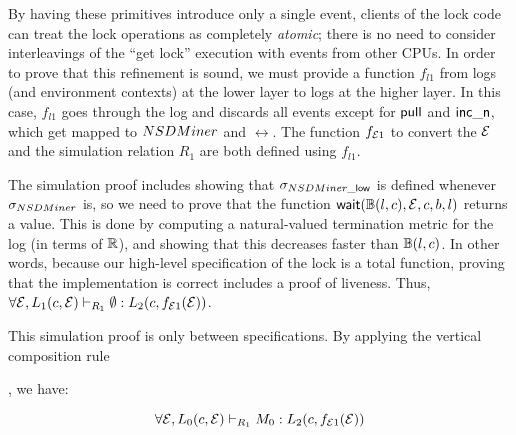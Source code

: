 By having these primitives introduce only a single event, clients of the
lock code can treat the lock operations as completely \emph{atomic}; there is
no need to consider interleavings of the ``get lock'' execution
with events from other CPUs. In order to prove that this refinement
is sound, we must provide a function $f_{l1}$ from logs (and environment
contexts) at the lower layer to logs at the higher layer.  In this
case, $f_{l1}$ goes through the log and discards all events except for
$\mathsf{pull}$ and $\mathsf{inc\_n}$, which get mapped to $NSDMiner$ and
$\rel$.
The function $f_{\mathcal{E}1}$ to convert the $\mathcal{E}$ 
and the simulation relation $R_1$ are both defined using $f_{l1}$.

The simulation proof
includes showing that $\sigma_{NSDMiner\_\mathsf{low}}$ is defined whenever
$\sigma_{NSDMiner}$ is, so we need to prove that the function
$\mathsf{wait}(\mathbb{B}(l, c), \mathcal{E}, c, b, l)$ returns a value. This is done
by computing a natural-valued termination metric for the log 
(in terms of
$\mathbb{R}$), and showing that this decreases faster than $\mathbb{B}(l,c)$. In other words,
because our high-level specification of the lock is a total function,
proving that the implementation is correct includes a proof of
liveness. Thus,
{\small 
$
\forall \mathcal{E}, 
L_1(c, \mathcal{E}) \vdash_{R_1} \emptyset : L_2(c,f_{\mathcal{E}1}(\mathcal{E}))
$}.%

This simulation proof is only between specifications.
By applying the vertical composition rule , we have:
\begin{small}
\[
\forall \mathcal{E}, 
L_0(c,\mathcal{E}) \vdash_{R_1} M_0 : L_2(c, f_{\mathcal{E}1}(\mathcal{E}))
\]
\vspace{-10 pt}
\end{small}


